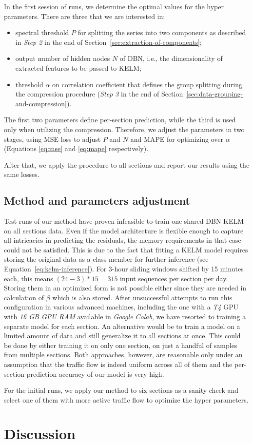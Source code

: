In the first session of runs, we determine the optimal values for the hyper
parameters. There are three that we are interested in:
\begin{itemize}
	\item spectral threshold $P$ for splitting the series into two components as
	described in \textit{Step 2} in the end of
	Section~\ref{sec:extraction-of-components};
	\item output number of hidden nodes $N$ of DBN, i.e., the dimensionality of
	extracted features to be passed to KELM;
	\item threshold $\alpha$ on correlation coefficient that defines the group
	splitting during the compression procedure (\textit{Step 3} in the end of
	Section~\ref{sec:data-grouping-and-compression}).
\end{itemize}
The first two parameters define per-section prediction, while the third is used
only when utilizing the compression. Therefore, we adjust the parameters in two
stages, using MSE loss to adjust $P$ and $N$ and MAPE for optimizing over
$\alpha$ (Equations \ref{eq:mse} and \ref{eq:mape} respectively).

After that, we apply the procedure to all sections and report our results using
the same losses.


\section{Method and parameters adjustment}

Test runs of our method have proven infeasible to train one shared DBN-KELM on
all sections data. Even if the model architecture is flexible enough to capture
all intricacies in predicting the residuals, the memory requirements in that
case could not be satisfied. This is due to the fact that fitting a KELM model
requires storing the original data as a class member for further inference (see
Equation~\ref{eq:kelm-inference}). For 3-hour sliding windows shifted by 15
minutes each, this means $(24-3)*15=315$ input sequences per section per day.
Storing them in an optimized form is not possible either since they are needed
in calculation of $\beta$ which is also stored. After unsuccessful attempts to
run this configuration in various advanced machines, including the one with a
\textit{T4} GPU with \textit{16 GB GPU RAM} available in \textit{Google Colab},
we have resorted to training a separate model for each section. An alternative
would be to train a model on a limited amount of data and still generalize it to
all sections at once. This could be done by either training it on only one
section, on just a handful of samples from multiple sections. Both approaches,
however, are reasonable only under an assumption that the traffic flow is indeed
uniform across all of them and the per-section prediction accuracy of our model
is very high.

For the initial runs, we apply our method to six sections as a sanity check and
select one of them with more active traffic flow to optimize the hyper
parameters.

\chapter{Discussion}


